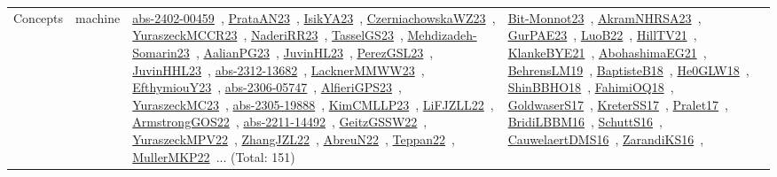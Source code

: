 {\begin{longtable}{lp{3cm}>{\raggedright\arraybackslash}p{6cm}>{\raggedright\arraybackslash}p{6cm}>{\raggedright\arraybackslash}p{8cm}}
Concepts & machine & \href{articles/abs-2402-00459.pdf}{abs-2402-00459}~\cite{abs-2402-00459}, \href{articles/PrataAN23.pdf}{PrataAN23}~\cite{PrataAN23}, \href{articles/IsikYA23.pdf}{IsikYA23}~\cite{IsikYA23}, \href{articles/CzerniachowskaWZ23.pdf}{CzerniachowskaWZ23}~\cite{CzerniachowskaWZ23}, \href{articles/YuraszeckMCCR23.pdf}{YuraszeckMCCR23}~\cite{YuraszeckMCCR23}, \href{articles/NaderiRR23.pdf}{NaderiRR23}~\cite{NaderiRR23}, \href{papers/TasselGS23.pdf}{TasselGS23}~\cite{TasselGS23}, \href{papers/Mehdizadeh-Somarin23.pdf}{Mehdizadeh-Somarin23}~\cite{Mehdizadeh-Somarin23}, \href{papers/AalianPG23.pdf}{AalianPG23}~\cite{AalianPG23}, \href{papers/JuvinHL23.pdf}{JuvinHL23}~\cite{JuvinHL23}, \href{papers/PerezGSL23.pdf}{PerezGSL23}~\cite{PerezGSL23}, \href{papers/JuvinHHL23.pdf}{JuvinHHL23}~\cite{JuvinHHL23}, \href{articles/abs-2312-13682.pdf}{abs-2312-13682}~\cite{abs-2312-13682}, \href{articles/LacknerMMWW23.pdf}{LacknerMMWW23}~\cite{LacknerMMWW23}, \href{papers/EfthymiouY23.pdf}{EfthymiouY23}~\cite{EfthymiouY23}, \href{articles/abs-2306-05747.pdf}{abs-2306-05747}~\cite{abs-2306-05747}, \href{articles/AlfieriGPS23.pdf}{AlfieriGPS23}~\cite{AlfieriGPS23}, \href{papers/YuraszeckMC23.pdf}{YuraszeckMC23}~\cite{YuraszeckMC23}, \href{articles/abs-2305-19888.pdf}{abs-2305-19888}~\cite{abs-2305-19888}, \href{papers/KimCMLLP23.pdf}{KimCMLLP23}~\cite{KimCMLLP23}, \href{papers/LiFJZLL22.pdf}{LiFJZLL22}~\cite{LiFJZLL22}, \href{papers/ArmstrongGOS22.pdf}{ArmstrongGOS22}~\cite{ArmstrongGOS22}, \href{articles/abs-2211-14492.pdf}{abs-2211-14492}~\cite{abs-2211-14492}, \href{papers/GeitzGSSW22.pdf}{GeitzGSSW22}~\cite{GeitzGSSW22}, \href{articles/YuraszeckMPV22.pdf}{YuraszeckMPV22}~\cite{YuraszeckMPV22}, \href{papers/ZhangJZL22.pdf}{ZhangJZL22}~\cite{ZhangJZL22}, \href{articles/AbreuN22.pdf}{AbreuN22}~\cite{AbreuN22}, \href{papers/Teppan22.pdf}{Teppan22}~\cite{Teppan22}, \href{articles/MullerMKP22.pdf}{MullerMKP22}~\cite{MullerMKP22}... (Total: 151) & \href{papers/Bit-Monnot23.pdf}{Bit-Monnot23}~\cite{Bit-Monnot23}, \href{articles/AkramNHRSA23.pdf}{AkramNHRSA23}~\cite{AkramNHRSA23}, \href{articles/GurPAE23.pdf}{GurPAE23}~\cite{GurPAE23}, \href{papers/LuoB22.pdf}{LuoB22}~\cite{LuoB22}, \href{papers/HillTV21.pdf}{HillTV21}~\cite{HillTV21}, \href{papers/KlankeBYE21.pdf}{KlankeBYE21}~\cite{KlankeBYE21}, \href{articles/AbohashimaEG21.pdf}{AbohashimaEG21}~\cite{AbohashimaEG21}, \href{papers/BehrensLM19.pdf}{BehrensLM19}~\cite{BehrensLM19}, \href{articles/BaptisteB18.pdf}{BaptisteB18}~\cite{BaptisteB18}, \href{papers/He0GLW18.pdf}{He0GLW18}~\cite{He0GLW18}, \href{articles/ShinBBHO18.pdf}{ShinBBHO18}~\cite{ShinBBHO18}, \href{articles/FahimiOQ18.pdf}{FahimiOQ18}~\cite{FahimiOQ18}, \href{papers/GoldwaserS17.pdf}{GoldwaserS17}~\cite{GoldwaserS17}, \href{articles/KreterSS17.pdf}{KreterSS17}~\cite{KreterSS17}, \href{papers/Pralet17.pdf}{Pralet17}~\cite{Pralet17}, \href{papers/BridiLBBM16.pdf}{BridiLBBM16}~\cite{BridiLBBM16}, \href{papers/SchuttS16.pdf}{SchuttS16}~\cite{SchuttS16}, \href{papers/CauwelaertDMS16.pdf}{CauwelaertDMS16}~\cite{CauwelaertDMS16}, \href{articles/ZarandiKS16.pdf}{ZarandiKS16}~\cite{ZarandiKS16}, 
\end{longtable}}
